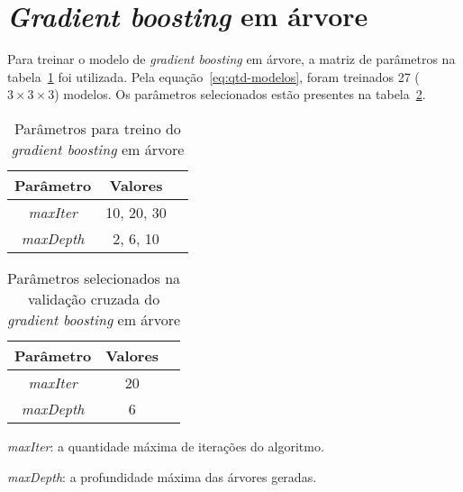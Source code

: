 \section{\textit{Gradient boosting} em árvore}
\label{sec:gbt}

Para treinar o modelo de \textit{gradient boosting} em árvore, a matriz de parâmetros na tabela~\ref{tab:param-gbt} foi utilizada.
Pela equação~\ref{eq:qtd-modelos}, foram treinados 27 ($3 \times 3 \times 3$) modelos.
Os parâmetros selecionados estão presentes na tabela~\ref{tab:param-final-gbt}.

\begin{table}[h]
    \centering
    \begin{tabular}{|c|c|c|}
        \hline
        Parâmetro         & Valores    \\ \hline
        \textit{maxIter}  & 10, 20, 30 \\
        \textit{maxDepth} & 2, 6, 10   \\ \hline
    \end{tabular}
    \caption{Parâmetros para treino do \textit{gradient boosting} em árvore}
    \label{tab:param-gbt}
\end{table}

\begin{table}[h]
    \centering
    \begin{tabular}{|c|c|c|}
        \hline
        Parâmetro         & Valores \\ \hline
        \textit{maxIter}  & 20      \\
        \textit{maxDepth} & 6       \\ \hline
    \end{tabular}
    \caption{Parâmetros selecionados na validação cruzada do \textit{gradient boosting} em árvore}
    \label{tab:param-final-gbt}
\end{table}

\textit{maxIter}: a quantidade máxima de iterações do algoritmo.

\textit{maxDepth}: a profundidade máxima das árvores geradas.
